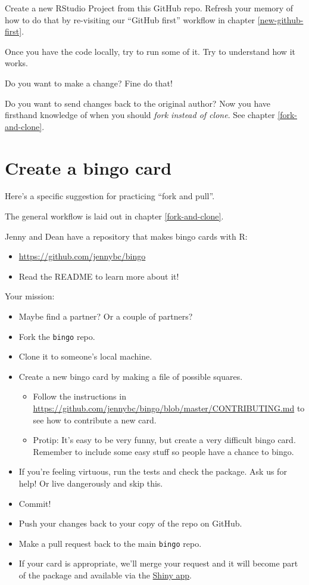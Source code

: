\documentclass[
]{book}
\providecommand{\tightlist}{%
  \setlength{\itemsep}{0pt}\setlength{\parskip}{0pt}}
\begin{document}
Create a new RStudio Project from this GitHub repo. Refresh your memory of how to do that by re-visiting our ``GitHub first'' workflow in chapter \ref{new-github-first}.

Once you have the code locally, try to run some of it. Try to understand how it works.

Do you want to make a change? Fine do that!

Do you want to send changes back to the original author? Now you have firsthand knowledge of when you should \emph{fork instead of clone}. See chapter \ref{fork-and-clone}.

\chapter{Create a bingo card}\label{bingo}

Here's a specific suggestion for practicing ``fork and pull''.

The general workflow is laid out in chapter \ref{fork-and-clone}.

Jenny and Dean have a repository that makes bingo cards with R:

\begin{itemize}
\tightlist
\item
  \url{https://github.com/jennybc/bingo}
\item
  Read the README to learn more about it!
\end{itemize}

Your mission:

\begin{itemize}
\tightlist
\item
  Maybe find a partner? Or a couple of partners?
\item
  Fork the \texttt{bingo} repo.
\item
  Clone it to someone's local machine.
\item
  Create a new bingo card by making a file of possible squares.

  \begin{itemize}
  \tightlist
  \item
    Follow the instructions in \url{https://github.com/jennybc/bingo/blob/master/CONTRIBUTING.md} to see how to contribute a new card.
  \item
    Protip: It's easy to be very funny, but create a very difficult bingo card. Remember to include some easy stuff so people have a chance to bingo.
  \end{itemize}
\item
  If you're feeling virtuous, run the tests and check the package. Ask us for help! Or live dangerously and skip this.
\item
  Commit!
\item
  Push your changes back to your copy of the repo on GitHub.
\item
  Make a pull request back to the main \texttt{bingo} repo.
\item
  If your card is appropriate, we'll merge your request and it will become part of the package and available via the \href{http://daattali.com/shiny/bingo/}{Shiny app}.
\end{itemize}
\end{document}
